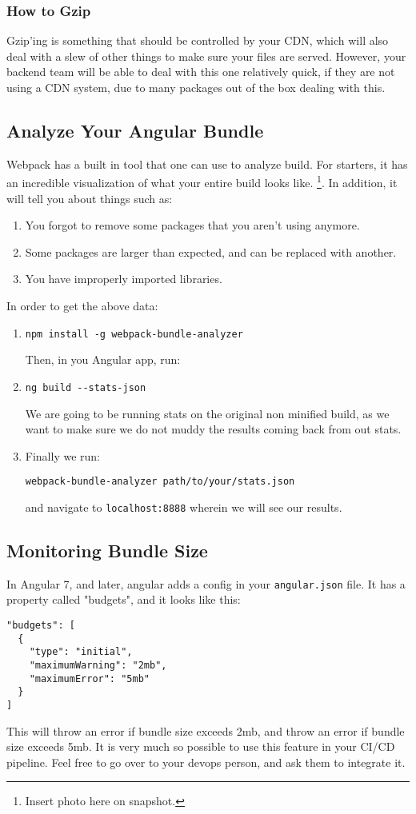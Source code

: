 \subsubsection{ How to Gzip }
Gzip'ing is something that should be controlled by your CDN, which will also 
deal with a slew of other things to make sure your files are served. However, 
your backend team will be able to deal with this one relatively quick, if they 
are not using a CDN system, due to many packages out of the box dealing with 
this. 

\subsection{Analyze Your Angular Bundle}
Webpack has a built in tool that one can use to analyze build. For starters, 
it has an incredible visualization of what your entire build looks like.
\footnote{Insert photo here on snapshot.}. In addition, it will tell you about 
things such as: 
\begin{enumerate}
  \item You forgot to remove some packages that you aren't using anymore.
  \item Some packages are larger than expected, and can be replaced with
  another.
  \item You have improperly imported libraries.
\end{enumerate}

In order to get the above data: 
\begin{enumerate}
\item 
\begin{verbatim}
npm install -g webpack-bundle-analyzer 
\end{verbatim}
Then, in you Angular app, run: 
\item 
\begin{verbatim}
ng build --stats-json
\end{verbatim}
We are going to be running stats on the original non minified build, as we 
want to make sure we do not muddy the results coming back from out stats. 
\item 
Finally we run: 
\begin{verbatim}
webpack-bundle-analyzer path/to/your/stats.json  
\end{verbatim}
and navigate to \lstinline{localhost:8888} wherein we will see our results.
\end{enumerate}

\subsection{Monitoring Bundle Size}
In Angular 7, and later, angular adds a config in your \lstinline{angular.json}
file. It has a property called "budgets", and it looks like this: 
\begin{lstlisting}
"budgets": [
  {
    "type": "initial",
    "maximumWarning": "2mb",
    "maximumError": "5mb"
  }
]   
\end{lstlisting}

This will throw an error if bundle size exceeds 2mb, and throw an error if 
bundle size exceeds 5mb. It is very much so possible to use this feature in
your CI/CD pipeline. Feel free to go over to your devops person, and ask them 
to integrate it. 
